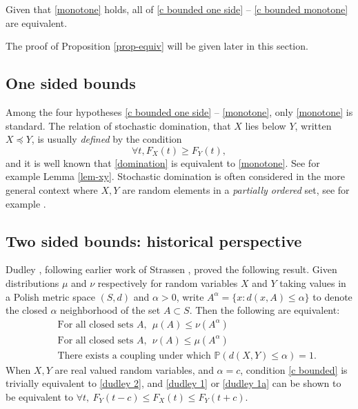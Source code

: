 \documentclass[smallextended,envcountsect]{svjour3}
\begin{document}
\begin{proposition} \label{prop-equiv} Given that \eqref{monotone} holds, all of
\eqref{c bounded one side} -- \eqref{c bounded monotone} are equivalent.
\end{proposition}

The proof of Proposition \ref{prop-equiv} will be given later in this section.

\subsection{One sided bounds}
Among the four hypotheses \eqref{c bounded one side} -- \eqref{monotone}, only \eqref{monotone} is standard.  The relation of stochastic domination, that $X$ lies below $Y$, written $X \preceq Y$, is usually \emph{defined} by the condition
\begin{equation}\label{domination}
\forall t,  F_X(t) \ge F_Y(t),
\end{equation}
and it is well known that \eqref{domination} is equivalent to \eqref{monotone}.  See for example Lemma \ref{lem-xy}.  Stochastic domination is often considered in the more general context where
$X,Y$ are random elements in a \emph{partially ordered} set, see for example \cite{Liggett}.

\subsection{Two sided bounds: historical perspective}

Dudley \cite[Prop 1 and Thm 2]{Dudley68}, following earlier work of Strassen \cite{Strassen65}, proved the following result.  Given distributions $\mu$ and $\nu$ respectively for random variables $X$ and $Y$ taking values in a Polish metric space $(S,d)$ and $\alpha > 0$, write $A^\alpha = \{ x :  d(x,A) \le \alpha \}$  to denote the closed $\alpha$ neighborhood of the set $A \subset S$.  Then the following are equivalent:
\begin{eqnarray} \label{dudley 1}
& & \text{For all closed sets } A,  \ \ \mu(A) \le \nu(A^\alpha)   \\[1ex]
\label{dudley 1a}
&  &\text{For all closed sets } A,  \ \ \nu(A) \le \mu(A^\alpha)  \\[1ex]
& & \label{dudley 2}
\text{There exists a coupling under which } {\mathbb{P}}(d(X,Y) \le \alpha) = 1.
\end{eqnarray}
When  $X,Y$ are real valued random variables, and $\alpha = c$, condition \eqref{c bounded} is trivially equivalent to  \eqref{dudley 2}, and \eqref{dudley 1} or \eqref{dudley 1a} can be shown to be equivalent to 
$\forall t, \ F_Y(t-c) \le F_X(t) \le F_Y(t+c)$.
\end{document}
